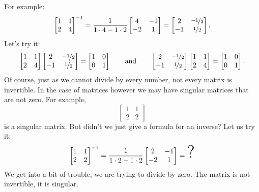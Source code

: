 For example:
\begin{equation*}
\begin{bmatrix}
1 & 1 \\
2 & 4
\end{bmatrix}^{-1}
=
\frac{1}{1\cdot 4-1 \cdot 2}
\begin{bmatrix}
4 & -1 \\
-2 & 1
\end{bmatrix}
=
\begin{bmatrix}
2 & \nicefrac{-1}{2} \\
-1 & \nicefrac{1}{2}
\end{bmatrix} .
\end{equation*}
Let's try it:
\begin{equation*}
\begin{bmatrix}
1 & 1 \\
2 & 4
\end{bmatrix}
\begin{bmatrix}
2 & \nicefrac{-1}{2} \\
-1 & \nicefrac{1}{2}
\end{bmatrix}
=
\begin{bmatrix}
1 & 0 \\
0 & 1
\end{bmatrix}
\qquad
\text{and}
\qquad
\begin{bmatrix}
2 & \nicefrac{-1}{2} \\
-1 & \nicefrac{1}{2}
\end{bmatrix}
\begin{bmatrix}
1 & 1 \\
2 & 4
\end{bmatrix}
=
\begin{bmatrix}
1 & 0 \\
0 & 1
\end{bmatrix} .
\end{equation*}
Of course, just as we cannot divide by every number, not every matrix is
invertible.  In the case of matrices however we may have singular
matrices that are not zero.  For example,
\begin{equation*}
\begin{bmatrix}
1 & 1 \\
2 & 2
\end{bmatrix}
\end{equation*}
is a singular matrix.  But didn't we just give a formula for an inverse?
Let us try it:
\begin{equation*}
\begin{bmatrix}
1 & 1 \\
2 & 2
\end{bmatrix}^{-1}
=
\frac{1}{1\cdot 2-1 \cdot 2}
\begin{bmatrix}
2 & -1 \\
-2 & 1
\end{bmatrix}
=
\text{\Huge ?}
\end{equation*}
We get into a bit of trouble, we are trying to divide by zero.
The matrix is not invertible, it is singular.

